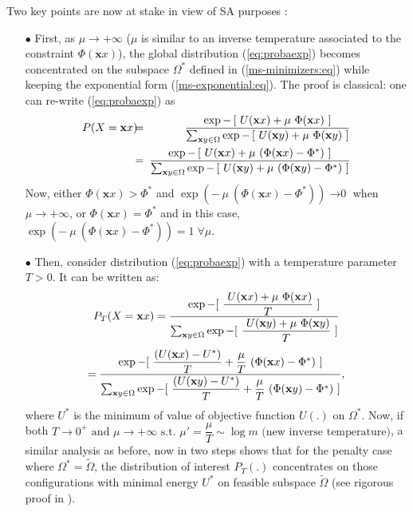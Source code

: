 \documentclass[draftcls,onecolumn]{IEEEtran}
\theoremstyle{plain}
\theoremstyle{definition}
\def\config{\mathbf{x}}
\def\multiplier{\mu}
\def\feasable{\tilde{\Omega}}
\def\potential{\Phi}
\def\multiplier{\mu}
\def\feasable{\tilde{\Omega}}
\def\constraintMinU{U^*}
\def\st{\mbox{ s.t. }} \def\ie{\mbox{\em i.e., }} \def\wrt{\mbox{\em wrt. }}
\def\st{\mbox{ s.t. }} \def\ie{\mbox{\em i.e., }}
\def\ra{\rightarrow}
\def\potential{\Phi}
\begin{document}
Two key points are now at stake in view of SA purposes 
\cite{geman-graffigne,robini-bresler-magnin}:
\begin{enumerate}
\item[$\bullet$]
First,
as $\multiplier \ra +\infty$
($\multiplier$ is similar to an inverse temperature associated to the constraint 
$\potential(\config{x}) $),
the global distribution 
(\ref{eq:probaexp}) becomes concentrated on the subspace 
$\Omega^*$ 
defined in (\ref{ms-minimizers:eq})
while keeping the exponential form (\ref{ms-exponential:eq}).
The proof is classical:
one can re-write
(\ref{eq:probaexp}) as
\begin{eqnarray}
P(X = \config{x}) \!\!\!&=&\!\!\! \dfrac {\exp - \left[\ U(\config{x}) +\multiplier\ \potential(\config{x})\ \right]}{\sum_{\config{y} \in \Omega} \exp - \left[\ U(\config{y}) + \multiplier\ \potential(\config{y}) \ \right]} \notag \\
\!\!\!&=&\!\!\! \dfrac{\exp - \left[\ U(\config{x})  + \multiplier\ ( \potential(\config{x}) -\potential^*)\ \right]}{
\sum_{\config{y} \in \Omega}{ \exp - \left[\ U(\config{y}) + \multiplier\ ( \potential(\config{y}) - \potential^*)\ \right]}} \notag
\end{eqnarray}
Now, either $\potential(\config{x}) > \potential^*$ and $\exp (-\ \multiplier\ ( \potential(\config{x})  - \potential^*))\mathop{\ra 0}$ when $\multiplier \ra +\infty$, or $\potential(\config{x})  = \potential^*$ and in this case, $\exp (-\ \multiplier\ ( \potential(\config{x})  - \potential^*))= 1\; \forall \multiplier$.
\item[$\bullet$]
Then, consider distribution (\ref{eq:probaexp}) with a temperature parameter $T > 0$.
It can be written as:
\begin{equation}
P_T(X = \config{x}) = 
\dfrac{\exp - [\ \dfrac{\ U(\config{x})  + \multiplier\ \potential(\config{x})}{T}\ ]}{
\sum_{\config{y} \in \Omega}{ 
\exp - [\ \dfrac{\ U(\config{y})  + \multiplier\ \potential(\config{y})}{T}\ ]}} \notag
\end{equation}
\begin{equation} 
=\dfrac{\exp - [\ \dfrac{(U(\config{x}) - \constraintMinU)}{T}  
               + \dfrac{\multiplier}{T}\ (\potential(\config{x}) - \potential^*)\ ]}
{\sum_{\config{y} \in \Omega} 
\exp - [\ \dfrac{(U(\config{y}) - \constraintMinU)}{T}  
               + \dfrac{\multiplier}{T}\ (\potential(\config{y}) - \potential^*)\ ]
}, \notag
\end{equation}
where 
$\constraintMinU$ 
is the minimum of value of objective function $U(.)$ on $\Omega^*$.
Now, if both 
$T \ra 0^+ \mbox{ and } \multiplier \ra +\infty 
\st
\multiplier' = \dfrac{\multiplier}{T} 
\sim \log m
\mbox{ (new inverse temperature)}
$,
a similar analysis as before,
now in two steps 
shows that for the penalty case
where  $\Omega^*= \feasable$,
the distribution of interest
$P_T(.)$
concentrates on those configurations with minimal energy
$\constraintMinU$
on feasible subspace $\tilde{\Omega}$ 
(see rigorous proof in 
\cite{geman-graffigne, robini-bresler-magnin}).
\end{enumerate}
 
\end{document}

